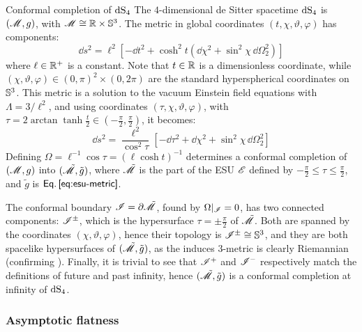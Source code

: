 \begin{example}{Conformal completion of $ \mathrm{dS}_4 $}{}
  The $ 4 $-dimensional de Sitter spacetime $ \mathrm{dS}_4 $ is $ (\mathscr{M} , g) $, with $ \mathscr{M} \cong \mathbb{R} \times \mathbb{S}^{3} $. The metric in global coordinates $ (t , \chi , \vartheta , \varphi) $ has components:
  \begin{equation*}
    \dd s^2 = \ell^2 \left[ - \dd t^2 + \cosh^2 t (\dd \chi^2 + \sin^2 \chi \, \dd \Omega_2^2) \right]
  \end{equation*}
  where $ \ell \in \mathbb{R}^+ $ is a constant. Note that $ t \in \mathbb{R} $ is a dimensionless coordinate, while $ (\chi , \vartheta , \varphi) \in (0,\pi)^2 \times (0,2\pi) $ are the standard hyperspherical coordinates on $ \mathbb{S}^{3} $. This metric is a solution to the vacuum Einstein field equations with $ \Lambda = 3 / \ell^2 $, and using coordinates $ (\tau , \chi , \vartheta , \varphi) $, with $ \tau = 2 \arctan \tanh \frac{t}{2} \in (- \frac{\pi}{2} , \frac{\pi}{2}) $, it becomes:
  \begin{equation*}
    \dd s^2 = \frac{\ell^2}{\cos^2 \tau} \left[ - \dd \tau^2 + \dd \chi^2 + \sin^2 \chi \, \dd \Omega_2^2 \right]
  \end{equation*}
  Defining $ \Omega = \ell^{-1} \cos \tau = (\ell \cosh t)^{-1} $ determines a conformal completion of $ (\mathscr{M} , g) $ into $ (\tilde{\mathscr{M}} , \tilde{g}) $, where $ \tilde{\mathscr{M}} $ is the part of the ESU $ \mathscr{E} $ defined by $ - \frac{\pi}{2} \leq \tau \leq \frac{\pi}{2} $, and $ \tilde{g} $ is $ \eref{eq:esu-metric} $.

  The conformal boundary $ \mathscr{I} = \partial \tilde{\mathscr{M}} $, found by $ \Omega \vert_\mathscr{I} = 0 $, has two connected components: $ \mathscr{I}^\pm $, which is the hypersurface $ \tau = \pm \frac{\pi}{2} $ of $ \tilde{\mathscr{M}} $. Both are spanned by the coordinates $ (\chi , \vartheta , \varphi) $, hence their topology is $ \mathscr{I}^\pm \cong \mathbb{S}^{3} $, and they are both spacelike hypersurfaces of $ (\tilde{\mathscr{M}} , \tilde{g}) $, as the induces $ 3 $-metric is clearly Riemannian (confirming ). Finally, it is trivial to see that $ \mathscr{I}^+ $ and $ \mathscr{I}^- $ respectively match the definitions of future and past infinity, hence $ (\tilde{\mathscr{M}} , \tilde{g}) $ is a conformal completion at infinity of $ \mathrm{dS}_4 $.
\end{example}

\subsubsection{Asymptotic flatness}
\label{sssec:asymptotic-flatness}

